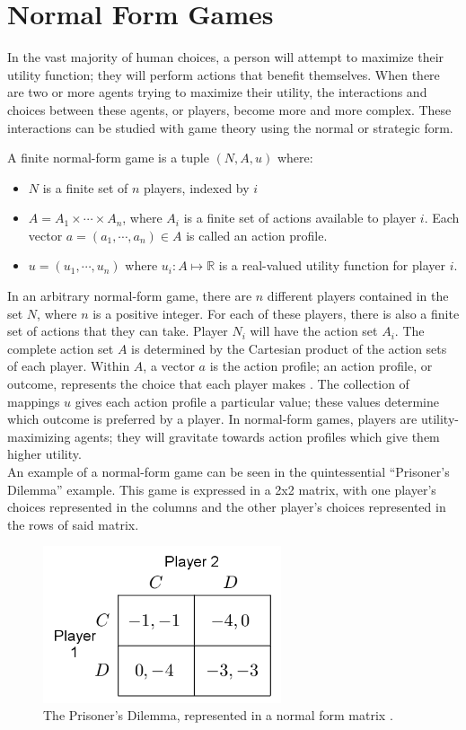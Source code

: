 \section{Normal Form Games}
In the vast majority of human choices, a person will attempt to maximize their utility function; they will perform actions that benefit themselves. When there are two or more agents trying to maximize their utility, the interactions and choices between these agents, or players, become more and more complex. These interactions can be studied with game theory using the normal or strategic form.
\begin{define}
  A finite normal-form game is a tuple $(N, A, u)$ where:
  \begin{itemize}
  \item $N$ is a finite set of $n$ players, indexed by $i$
  \item $A=A_1\times\cdots\times A_n$, where $A_i$ is a finite set of actions available to player $i$. Each vector $a=(a_1,\cdots ,a_n)\in A$ is called an action profile.
    \item $u=(u_1,\cdots ,u_n)$ where $u_i : A \mapsto\mathbb{R}$ is a real-valued utility function for player $i$. \cite{shoh09}
\end{itemize}
\end{define}

In an arbitrary normal-form game, there are $n$ different players contained in the set $N$, where $n$ is a positive integer. For each of these players, there is also a finite set of actions that they can take. Player $N_i$ will have the action set $A_i$. The complete action set $A$ is determined by the Cartesian product of the action sets of each player. Within $A$, a vector $a$ is the action profile; an action profile, or outcome, represents the choice that each player makes \cite{osbo94}. The collection of mappings $u$ gives each action profile a particular value; these values determine which outcome is preferred by a player. In normal-form games, players are utility-maximizing agents; they will gravitate towards action profiles which give them higher utility.\\

An example of a normal-form game can be seen in the quintessential ``Prisoner's Dilemma'' example. This game is expressed in a 2x2 matrix, with one player's choices represented in the columns and the other player's choices represented in the rows of said matrix.

\begin{figure}[H]
  \centering
  \includegraphics[width=7cm]{figures/ExampleGrid.png}
  \caption{The Prisoner's Dilemma, represented in a normal form matrix \cite{shoh09}.}
  \label{fig:prisoner}
\end{figure}

